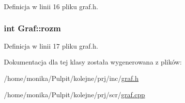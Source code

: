 \-Definicja w linii 16 pliku graf.\-h.

\hypertarget{class_graf_aac4d211e752539963f002d255991f5b4}{
\subsubsection[{rozm}]{\setlength{\rightskip}{0pt plus 5cm}int {\bf \-Graf\-::rozm}}}\label{class_graf_aac4d211e752539963f002d255991f5b4}


\-Definicja w linii 17 pliku graf.\-h.



\-Dokumentacja dla tej klasy została wygenerowana z plików\-:\begin{DoxyCompactItemize}
\item 
/home/monika/\-Pulpit/kolejne/prj/inc/\hyperlink{graf_8h}{graf.\-h}\item 
/home/monika/\-Pulpit/kolejne/prj/scr/\hyperlink{graf_8cpp}{graf.\-cpp}\end{DoxyCompactItemize}
